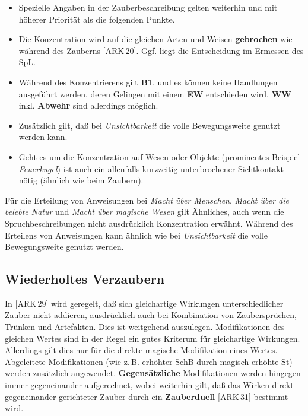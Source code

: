 \documentclass[10pt,a4paper,germanpar]{article}
\begin{document}
\begin{itemize}
\item Spezielle Angaben in der Zauberbeschreibung gelten
  weiterhin und mit höherer Priorität als die folgenden Punkte.
\item Die Konzentration wird auf die gleichen Arten und Weisen
  \textbf{gebrochen} wie während des Zauberns [ARK\,20]. Ggf. liegt
  die Entscheidung im Ermessen des SpL.
\item Während des Konzentrierens gilt \textbf{B1}, und es können keine
  Handlungen ausgeführt werden, deren Gelingen mit einem \textbf{EW}
  entschieden wird. \textbf{WW} inkl. \textbf{Abwehr} sind allerdings
  möglich.
\item Zusätzlich gilt, daß bei \emph{Unsichtbarkeit} die volle
  Bewegungsweite genutzt werden kann.
\item Geht es um die Konzentration auf Wesen oder Objekte (prominentes
  Beispiel \emph{Feuerkugel}) ist auch ein allenfalls kurzzeitig
  unterbrochener Sichtkontakt nötig (ähnlich wie beim Zaubern).
\end{itemize}

Für die Erteilung von Anweisungen bei \emph{Macht über Menschen},
\emph{Macht über die belebte Natur} und \emph{Macht über magische
Wesen} gilt Ähnliches, auch wenn die Spruchbeschreibungen nicht
ausdrücklich Konzentration erwähnt. Während des Erteilens von
Anweisungen kann ähnlich wie bei \emph{Unsichtbarkeit} die volle
Bewegungsweite genutzt werden.

\subsection{Wiederholtes Verzaubern}

In [ARK\,29] wird geregelt, daß sich gleichartige Wirkungen
unterschiedlicher Zauber nicht addieren, ausdrücklich auch bei
Kombination von Zaubersprüchen, Trünken und Artefakten. Dies ist
weitgehend auszulegen. Modifikationen des gleichen Wertes sind in der
Regel ein gutes Kriterum für gleichartige Wirkungen. Allerdings gilt
dies nur für die direkte magische Modifikation eines
Wertes. Abgeleitete Modifikationen (wie z.\,B. erhöhter SchB durch
magisch erhöhte St) werden zusätzlich
angewendet. \textbf{Gegensätzliche} Modifikationen werden hingegen
immer gegeneinander aufgerechnet, wobei weiterhin gilt, daß das Wirken
direkt gegeneinander gerichteter Zauber durch ein \textbf{Zauberduell}
[ARK\,31] bestimmt wird.
\end{document}
